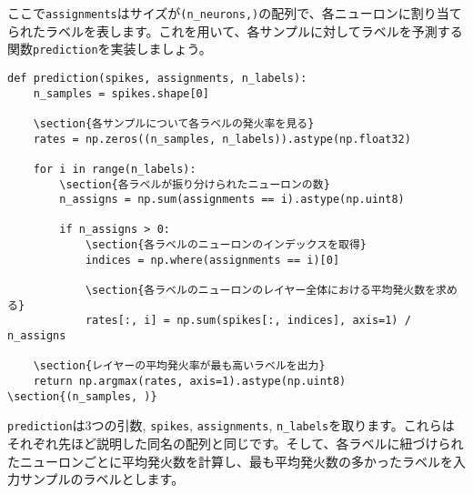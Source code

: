 ここで\texttt{assignments}はサイズが\texttt{(n\_neurons,)}の配列で、各ニューロンに割り当てられたラベルを表します。これを用いて、各サンプルに対してラベルを予測する関数\texttt{prediction}を実装しましょう。
\begin{verbatim}
def prediction(spikes, assignments, n_labels):    
    n_samples = spikes.shape[0]
    
    \section{各サンプルについて各ラベルの発火率を見る}
    rates = np.zeros((n_samples, n_labels)).astype(np.float32)
    
    for i in range(n_labels):
        \section{各ラベルが振り分けられたニューロンの数}
        n_assigns = np.sum(assignments == i).astype(np.uint8)
    
        if n_assigns > 0:
            \section{各ラベルのニューロンのインデックスを取得}
            indices = np.where(assignments == i)[0]
    
            \section{各ラベルのニューロンのレイヤー全体における平均発火数を求める}
            rates[:, i] = np.sum(spikes[:, indices], axis=1) / n_assigns
    
    \section{レイヤーの平均発火率が最も高いラベルを出力}
    return np.argmax(rates, axis=1).astype(np.uint8) \section{(n_samples, )}
\end{verbatim}
\texttt{prediction}は3つの引数, \texttt{spikes}, \texttt{assignments}, \texttt{n\_labels}を取ります。これらはそれぞれ先ほど説明した同名の配列と同じです。そして、各ラベルに紐づけられたニューロンごとに平均発火数を計算し、最も平均発火数の多かったラベルを入力サンプルのラベルとします。
